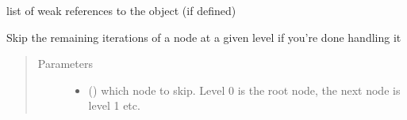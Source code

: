 \documentclass[a4paper,10pt,english]{sphinxmanual}
\begin{document}
\begin{fulllineitems}

\begin{fulllineitems}
\label{\detokenize{fagus.iterators:fagus.iterators.FagusIterator.__module__}}
\pysigstartsignatures
{}
\pysigstopsignatures
\end{fulllineitems}


\begin{fulllineitems}
\label{\detokenize{fagus.iterators:fagus.iterators.FagusIterator.__weakref__}}
\pysigstartsignatures
{}
\pysigstopsignatures
\sphinxAtStartPar
list of weak references to the object (if defined)

\end{fulllineitems}


\begin{fulllineitems}
\label{\detokenize{fagus.iterators:fagus.iterators.FagusIterator.__next__}}
\pysigstartsignatures
{}
\pysigstopsignatures
\end{fulllineitems}


\begin{fulllineitems}
\label{\detokenize{fagus.iterators:fagus.iterators.FagusIterator.skip}}
\pysigstartsignatures
{}
\pysigstopsignatures
\sphinxAtStartPar
Skip the remaining iterations of a node at a given level if you’re done handling it
\begin{quote}\begin{description}
\item[{Parameters}] \leavevmode\begin{itemize}
\item {}
\sphinxAtStartPar
{} () \textendash{} which node to skip. Level 0 is the root node, the next node is level 1 etc.


\end{itemize}
\end{description}
\end{quote}
\end{fulllineitems}
\end{fulllineitems}
\end{document}
